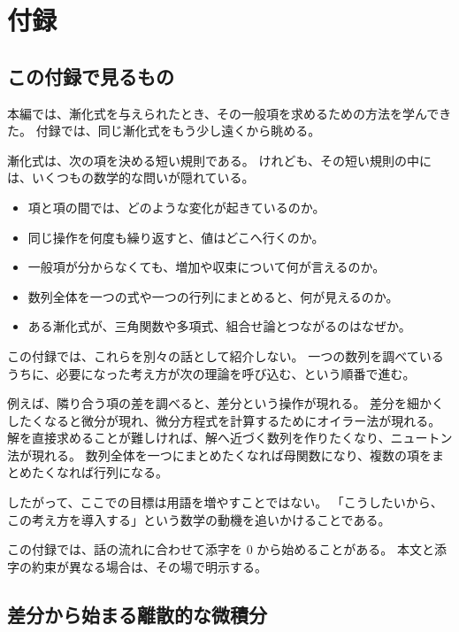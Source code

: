 
\chapter{付録}

\section*{この付録で見るもの}

本編では、漸化式を与えられたとき、その一般項を求めるための方法を学んできた。
付録では、同じ漸化式をもう少し遠くから眺める。

漸化式は、次の項を決める短い規則である。
けれども、その短い規則の中には、いくつもの数学的な問いが隠れている。

\begin{itemize}
  \item 項と項の間では、どのような変化が起きているのか。
  \item 同じ操作を何度も繰り返すと、値はどこへ行くのか。
  \item 一般項が分からなくても、増加や収束について何が言えるのか。
  \item 数列全体を一つの式や一つの行列にまとめると、何が見えるのか。
  \item ある漸化式が、三角関数や多項式、組合せ論とつながるのはなぜか。
\end{itemize}

この付録では、これらを別々の話として紹介しない。
一つの数列を調べているうちに、必要になった考え方が次の理論を呼び込む、という順番で進む。

例えば、隣り合う項の差を調べると、差分という操作が現れる。
差分を細かくしたくなると微分が現れ、微分方程式を計算するためにオイラー法が現れる。
解を直接求めることが難しければ、解へ近づく数列を作りたくなり、ニュートン法が現れる。
数列全体を一つにまとめたくなれば母関数になり、複数の項をまとめたくなれば行列になる。

したがって、ここでの目標は用語を増やすことではない。
「こうしたいから、この考え方を導入する」という数学の動機を追いかけることである。

この付録では、話の流れに合わせて添字を $0$ から始めることがある。
本文と添字の約束が異なる場合は、その場で明示する。



\section{差分から始まる離散的な微積分}

